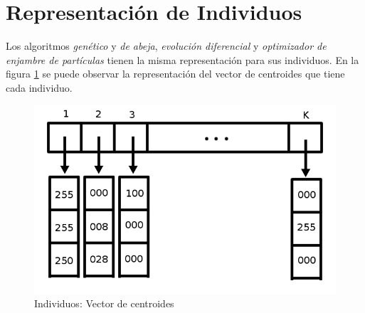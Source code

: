 \section{Representación de Individuos} \label{sect:repind}

    Los algoritmos \emph{genético} y \emph{de abeja}, \emph{evolución diferencial} y
\emph{optimizador de enjambre de partículas} tienen la misma representación para
sus individuos. En la figura \ref{fig:individual}\cite{DoGeGr2007} se puede observar la representación
del vector de centroides que tiene cada individuo.

\begin{figure}[!h]
    \centering
    \includegraphics[scale=0.4]{figures/individual.png}
    \caption{Individuos: Vector de centroides}
    \label{fig:individual}
\end{figure}

